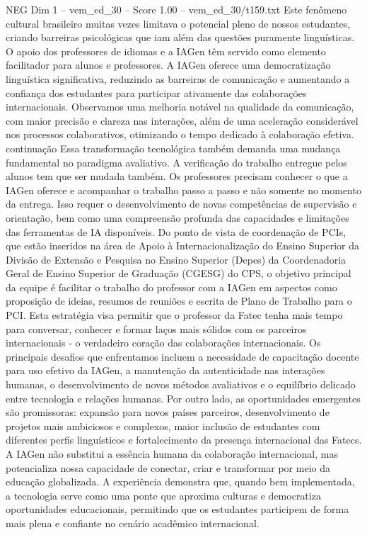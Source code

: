 \begin{textsample}{NEG Dim 1 – vem\_ed\_30 – Score 1.00 – vem\_ed\_30/t159.txt}
Este fenômeno cultural brasileiro muitas vezes limitava o potencial pleno de nossos estudantes, criando barreiras psicológicas que iam além das questões puramente linguísticas.
O apoio dos professores de idiomas e a IAGen têm servido como elemento facilitador para alunos e professores.
A IAGen oferece uma democratização linguística significativa, reduzindo as barreiras de comunicação e aumentando a confiança dos estudantes para participar ativamente das colaborações internacionais.
Observamos uma melhoria notável na qualidade da comunicação, com maior precisão e clareza nas interações, além de uma aceleração considerável nos processos colaborativos, otimizando o tempo dedicado à colaboração efetiva. continuação Essa transformação tecnológica também demanda uma mudança fundamental no paradigma avaliativo.
A verificação do trabalho entregue pelos alunos tem que ser mudada também.
Os professores precisam conhecer o que a IAGen oferece e acompanhar o trabalho passo a passo e não somente no momento da entrega.
Isso requer o desenvolvimento de novas competências de supervisão e orientação, bem como uma compreensão profunda das capacidades e limitações das ferramentas de IA disponíveis.
Do ponto de vista de coordenação de PCIs, que estão inseridos na área de Apoio à Internacionalização do Ensino Superior da Divisão de Extensão e Pesquisa no Ensino Superior (Depes) da Coordenadoria Geral de Ensino Superior de Graduação (CGESG) do CPS, o objetivo principal da equipe é facilitar o trabalho do professor com a IAGen em aspectos como proposição de ideias, resumos de reuniões e escrita de Plano de Trabalho para o PCI.
Esta estratégia visa permitir que o professor da Fatec tenha mais tempo para conversar, conhecer e formar laços mais sólidos com os parceiros internacionais - o verdadeiro coração das colaborações internacionais.
Os principais desafios que enfrentamos incluem a necessidade de capacitação docente para uso efetivo da IAGen, a manutenção da autenticidade nas interações humanas, o desenvolvimento de novos métodos avaliativos e o equilíbrio delicado entre tecnologia e relações humanas.
Por outro lado, as oportunidades emergentes são promissoras: expansão para novos países parceiros, desenvolvimento de projetos mais ambiciosos e complexos, maior inclusão de estudantes com diferentes perfis linguísticos e fortalecimento da presença internacional das Fatecs.
A IAGen não substitui a essência humana da colaboração internacional, mas potencializa nossa capacidade de conectar, criar e transformar por meio da educação globalizada.
A experiência demonstra que, quando bem implementada, a tecnologia serve como uma ponte que aproxima culturas e democratiza oportunidades educacionais, permitindo que os estudantes participem de forma mais plena e confiante no cenário acadêmico internacional.

\end{textsample}
